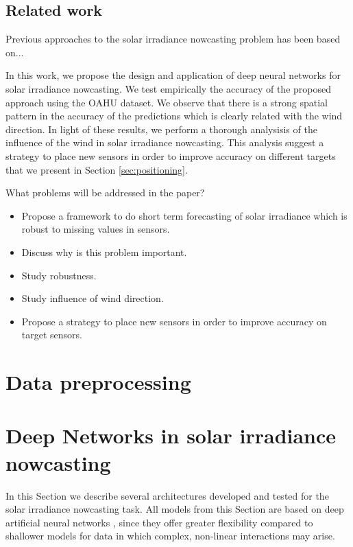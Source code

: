 \documentclass[preprints,article,accept,moreauthors,pdftex]{template/mdpi}
\begin{document}
\subsection{Related work}

Previous approaches to the solar irradiance nowcasting problem has been based on...


In this work, we propose the design and application of deep neural networks for solar irradiance nowcasting. We test empirically the accuracy of the proposed approach using the OAHU dataset. We observe that there is a strong spatial pattern in the accuracy of the predictions which is clearly related with the wind direction. In light of these results, we perform a thorough analysisis of the influence of the wind in solar irradiance nowcasting. This analysis suggest a strategy to place new sensors in order to improve accuracy on different targets that we present in Section \ref{sec:positioning}.


What problems will be addressed in the paper?
\begin{itemize}
    \item Propose a framework to do short term forecasting of solar irradiance which is robust to missing values in sensors. 
    \item Discuss why is this problem important.
    \item Study robustness.
    \item Study influence of wind direction.
    \item Propose a strategy to place new sensors in order to improve accuracy on target sensors.
\end{itemize}


\section{Data preprocessing}\label{sec:prep}

\section{Deep Networks in solar irradiance nowcasting}\label{sec:models}

In this Section we describe several architectures developed and tested for the solar irradiance nowcasting task. All models from this Section are based on deep artificial neural networks \cite{Goodfellow-et-al-2016}, since they offer greater flexibility compared to shallower models for data in which complex, non-linear interactions may arise. 
\end{document}
